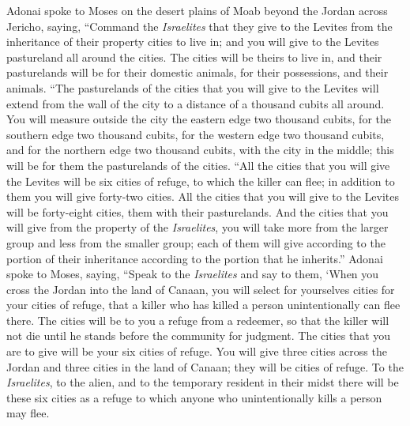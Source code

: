 \begin{biblechapter} %
 Adonai spoke to Moses on the desert plains of Moab beyond the Jordan across Jericho, saying,
\verse “Command the \textit{Israelites} that they give to the Levites from the inheritance of their property cities to live in; and you will give to the Levites pastureland all around the cities.
\verse The cities will be theirs to live in, and their pasturelands will be for their domestic animals, for their possessions, and their animals.
\verse “The pasturelands of the cities that you will give to the Levites will extend from the wall of the city to a distance of a thousand cubits all around.
\verse You will measure outside the city the eastern edge two thousand cubits, for the southern edge two thousand cubits, for the western edge two thousand cubits, and for the northern edge two thousand cubits, with the city in the middle; this will be for them the pasturelands of the cities.
\verse “All the cities that you will give the Levites will be six cities of refuge, to which the killer can flee; in addition to them you will give forty-two cities.
\verse All the cities that you will give to the Levites will be forty-eight cities, them with their pasturelands.
\verse And the cities that you will give from the property of the \textit{Israelites}, you will take more from the larger group and less from the smaller group; each of them will give according to the portion of their inheritance according to the portion that he inherits.”
 Adonai spoke to Moses, saying,
\verse “Speak to the \textit{Israelites} and say to them, ‘When you cross the Jordan into the land of Canaan,
\verse you will select for yourselves cities for your cities of refuge, that a killer who has killed a person unintentionally can flee there.
\verse The cities will be to you a refuge from a redeemer, so that the killer will not die until he stands before the community for judgment.
\verse The cities that you are to give will be your six cities of refuge.
\verse You will give three cities across the Jordan and three cities in the land of Canaan; they will be cities of refuge.
\verse To the \textit{Israelites}, to the alien, and to the temporary resident in their midst there will be these six cities as a refuge to which anyone who unintentionally kills a person may flee.

\end{biblechapter}
